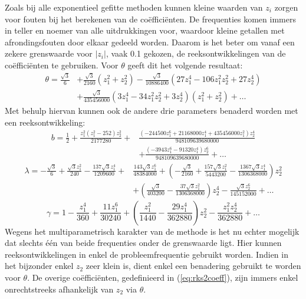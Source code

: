 \documentclass[12pt]{article}
\begin{document}
Zoals bij alle exponentieel gefitte methoden kunnen kleine waarden van \(z_i\) zorgen voor fouten bij het berekenen van de coëfficiënten. De frequenties komen immers in teller en noemer van alle uitdrukkingen voor, waardoor kleine getallen met afrondingsfouten door elkaar gedeeld worden. Daarom is het beter om vanaf een zekere grenswaarde voor \(|z_i|\), vaak 0.1 gekozen, de reeksontwikkelingen van de coëfficiënten te gebruiken. Voor \(\theta\) geeft dit het volgende resultaat:
\begin{equation} \label{eq:thetas2series}
    \begin{split}
        \theta=\frac{\sqrt{3}}{6}&+\frac{\sqrt{3}}{2160}(z_1^2+z_2^2)-\frac{\sqrt{3}}{10886400}(27z_1^4-106z_1^2z_2^2+27z_2^4) \\
        &+\frac{\sqrt{3}}{435456000}(3z_1^4-34z_1^2z_2^2+3z_2^4)(z_1^2+z_2^2)+\dots
    \end{split}
\end{equation}
Met behulp hiervan kunnen ook de andere drie parameters benaderd worden met een reeksontwikkeling:
\begin{equation} \label{eq:bs2series}
\begin{split}
    b=\frac{1}{2}+\frac{z_1^2(z_1^2-252)z_2^2}{2177280}+&\frac{(-244500z_1^6 + 21168000z_1^4+435456000z_1^2)z_2^4}{948109639680000} \\ &+\frac{(-3943z_1^6-91320z_1^4)z_2^6}{948109639680000}+\dots
\end{split}
\end{equation}
\begin{equation} \label{eq:ls2series}
\begin{split}
    \lambda=-\frac{\sqrt{3}}{6}+\frac{\sqrt{3}z_1^2}{240}-\frac{137\sqrt{3}z_1^4}{1209600}+&\frac{143\sqrt{3}z_1^6}{48384000}+\left(-\frac{\sqrt{3}}{2160} +\frac{157\sqrt{3}z_1^2}{5443200}-\frac{1367\sqrt{3}z_1^4}{1306368000}\right)z_2^2 \\ &+\left(\frac{\sqrt{3}}{403200} - \frac{37\sqrt{3}z_1^2}{1306368000}\right)z_2^4- \frac{\sqrt{3}z_2^6}{145152000}+\dots
\end{split}
\end{equation}
\begin{equation} \label{eq:gs2series}
    \gamma=1-\frac{z_1^4}{360}+\frac{11z_1^6}{30240}+\left(\frac{z_1^2}{1440}-\frac{29z_1^4}{362880}\right)z_2^2-\frac{z_1^2z_2^4}{362880}+\dots
\end{equation}
Wegens het multiparametrisch karakter van de methode is het nu echter mogelijk dat slechts één van beide frequenties onder de grenswaarde ligt. Hier kunnen reeksontwikkelingen in enkel de probleemfrequentie gebruikt worden. Indien in het bijzonder enkel \(z_2\) zeer klein is, dient enkel een benadering gebruikt te worden voor \(\theta\). De overige coëfficiënten, gedefinieerd in (\ref{eq:rks2coeff}), zijn immers enkel onrechtstreeks afhankelijk van \(z_2\) via \(\theta\).
\end{document}

